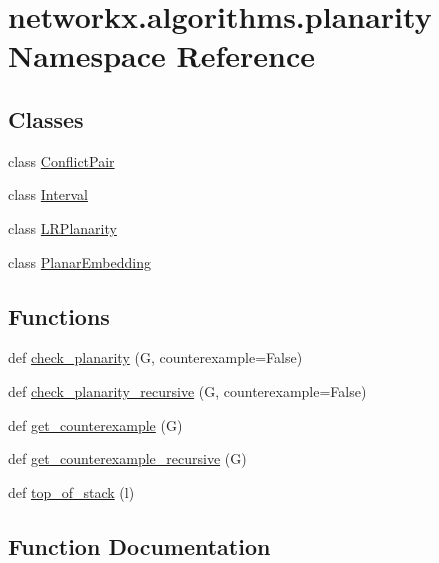 \hypertarget{namespacenetworkx_1_1algorithms_1_1planarity}{}\section{networkx.\+algorithms.\+planarity Namespace Reference}
\label{namespacenetworkx_1_1algorithms_1_1planarity}
\subsection*{Classes}
\begin{DoxyCompactItemize}
\item 
class \hyperlink{classnetworkx_1_1algorithms_1_1planarity_1_1ConflictPair}{Conflict\+Pair}
\item 
class \hyperlink{classnetworkx_1_1algorithms_1_1planarity_1_1Interval}{Interval}
\item 
class \hyperlink{classnetworkx_1_1algorithms_1_1planarity_1_1LRPlanarity}{L\+R\+Planarity}
\item 
class \hyperlink{classnetworkx_1_1algorithms_1_1planarity_1_1PlanarEmbedding}{Planar\+Embedding}
\end{DoxyCompactItemize}
\subsection*{Functions}
\begin{DoxyCompactItemize}
\item 
def \hyperlink{namespacenetworkx_1_1algorithms_1_1planarity_aa8143fee916a7ba1661ba6c9eb312758}{check\+\_\+planarity} (G, counterexample=False)
\item 
def \hyperlink{namespacenetworkx_1_1algorithms_1_1planarity_a24f924dcf458682337d2a5d97582f027}{check\+\_\+planarity\+\_\+recursive} (G, counterexample=False)
\item 
def \hyperlink{namespacenetworkx_1_1algorithms_1_1planarity_a97ea2c6e41104ab6c6ec657ca362a0cf}{get\+\_\+counterexample} (G)
\item 
def \hyperlink{namespacenetworkx_1_1algorithms_1_1planarity_a229d1aa5c79f2e3fd5cecb59f947d955}{get\+\_\+counterexample\+\_\+recursive} (G)
\item 
def \hyperlink{namespacenetworkx_1_1algorithms_1_1planarity_ad9d14e1fb52877b3f48cb8b3cc6dd3d6}{top\+\_\+of\+\_\+stack} (l)
\end{DoxyCompactItemize}


\subsection{Function Documentation}
\mbox{\label{namespacenetworkx_1_1algorithms_1_1planarity_aa8143fee916a7ba1661ba6c9eb312758}} 

